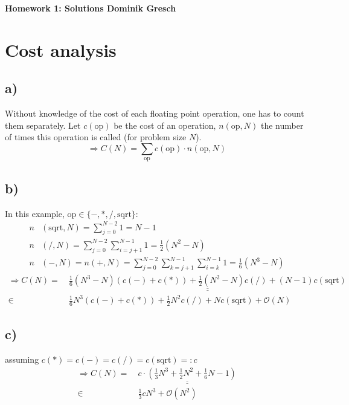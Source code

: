 \documentclass[11pt]{article}
\begin{document}
\hspace{0.2 in}
\begin{center}
	\begin{Large}
		\textbf{Homework 1: Solutions Dominik Gresch}
	\end{Large}
\end{center}
\section{Cost analysis}
	\subsection*{a)}
		Without knowledge of the cost of each floating point operation, one has to count them separately. Let $c(\text{op})$ be the cost of an operation, $n(\text{op},N)$ the number of times this operation is called (for problem size $N$). 
		\[ \Rightarrow C(N) = \sum_\text{op} c(\text{op}) \cdot n(\text{op}, N) \]
	\subsection*{b)}
		In this example, $\text{op} \in \{ -, *, /, \text{sqrt}  \}$:
		\begin{align*}
		n&(\text{sqrt}, N) = \sum\limits_{j = 0}^{N - 2} 1 = N - 1 \\
		n&(/, N) = \sum\limits_{j = 0}^{N - 2}\sum\limits_{i = j + 1}^{N - 1}1 = \frac{1}{2}(N^2 - N) \\
		n&(-, N) = n(+, N) = \sum\limits_{j = 0}^{N - 2}\sum\limits_{k = j + 1}^{N - 1}\sum\limits_{i = k}^{N - 1}1 = \frac{1}{6}(N^3 - N) 
		\end{align*}
		\begin{align*}
			\Rightarrow C(N) =&~ \underline{\underline{\frac{1}{6}(N^3 - N)(c(-) + c(*)) + \frac{1}{2}(N^2 - N)c(/) + (N - 1)c(\text{sqrt})  }} \\
			\in &~ \frac{1}{6}N^3(c(-) + c(*)) + \frac{1}{2} N^2 c(/) + N c(\text{sqrt}) + \mathcal{O}(N)  
		\end{align*}
	\subsection*{c)}
	assuming $c(*) = c(-) = c(/) = c(\text{sqrt}) =: c$
	\begin{align*}
		\Rightarrow C(N) = &~ \underline{\underline{c\cdot\left(\frac{1}{3} N^3 + \frac{1}{2} N^2 + \frac{1}{6}N - 1 \right)}} \\
		\in& ~\frac{1}{3} c N^3 + \mathcal{O}(N^2)
	\end{align*}
	\newpage
\end{document}

